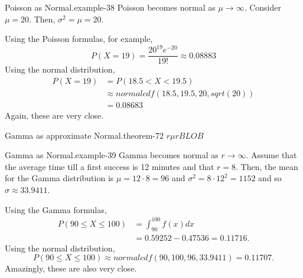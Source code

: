 \documentclass[10pt,]{book}
\numberwithin{equation}{section}
\newcommand{\lt}{<}
\begin{document}
\begin{example}{Poisson as Normal.}{example-38}%
\hypertarget{p-1079}{}%
Poisson becomes normal as \(\mu \rightarrow \infty\).  Consider \(\mu = 20\).  Then, \(\sigma^2 = \mu = 20\).%
\par
\hypertarget{p-1080}{}%
Using the Poisson formulas, for example,%
\begin{equation*}
P( X = 19 ) = \frac{20^{19} e^{-20}}{19!} \approx 0.08883
\end{equation*}
Using the normal distribution,%
\begin{align*}
P( X = 19 ) & = P( 18.5 \lt X \lt 19.5) \\
& \approx normalcdf(18.5,19.5,20,sqrt(20)) \\
& = 0.08683
\end{align*}
Again, these are very close.%
\end{example}
\begin{theorem}{Gamma as approximate Normal.}{}{theorem-72}%
\(r \mu\)\(r BLOB\)\end{theorem}
\begin{example}{Gamma as Normal.}{example-39}%
\hypertarget{p-1081}{}%
Gamma becomes normal as \(r \rightarrow \infty\).  Assume that the average time till a first success is 12 minutes and that \(r = 8\).  Then, the mean for the Gamma distribution is \(\mu = 12 \cdot 8 = 96\) and \(\sigma^2 = 8 \cdot 12^2 = 1152\) and so \(\sigma \approx 33.9411\).%
\par
\hypertarget{p-1082}{}%
Using the Gamma formulas,%
\begin{align*}
P( 90 \le X \le 100 ) & = \int_{90}^{100} f(x) dx \\
& = 0.59252 - 0.47536 = 0.11716.
\end{align*}
Using the normal distribution,%
\begin{equation*}
P( 90 \le X \le 100) \approx normalcdf(90,100,96,33.9411) = 0.11707.
\end{equation*}
Amazingly, these are also very close.%
\end{example}
\end{document}
